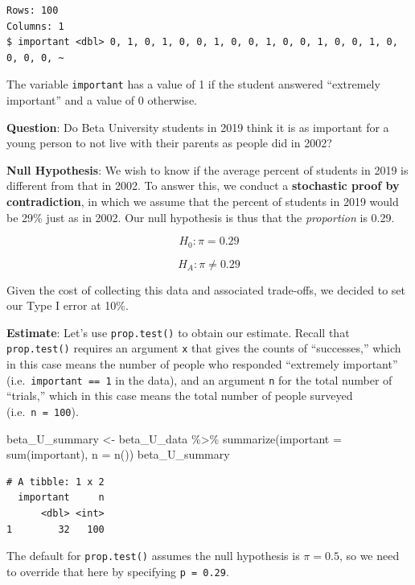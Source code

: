 \documentclass[
  letterpaper,
  DIV=11,
  numbers=noendperiod]{scrreprt}
\newenvironment{Shaded}{\begin{snugshade}}{\end{snugshade}}
\newcommand{\AttributeTok}[1]{\textcolor[rgb]{0.40,0.45,0.13}{#1}}
\newcommand{\FunctionTok}[1]{\textcolor[rgb]{0.28,0.35,0.67}{#1}}
\newcommand{\NormalTok}[1]{\textcolor[rgb]{0.00,0.23,0.31}{#1}}
\newcommand{\OtherTok}[1]{\textcolor[rgb]{0.00,0.23,0.31}{#1}}
\newcommand{\SpecialCharTok}[1]{\textcolor[rgb]{0.37,0.37,0.37}{#1}}
\theoremstyle{definition}
\theoremstyle{remark}
\begin{document}
\begin{verbatim}
Rows: 100
Columns: 1
$ important <dbl> 0, 1, 0, 1, 0, 0, 1, 0, 0, 1, 0, 0, 1, 0, 0, 1, 0, 0, 0, 0, ~
\end{verbatim}

The variable \texttt{important} has a value of 1 if the student answered
``extremely important'' and a value of 0 otherwise.

\textbf{Question}: Do Beta University students in 2019 think it is as
important for a young person to not live with their parents as people
did in 2002?

\textbf{Null Hypothesis}: We wish to know if the average percent of
students in 2019 is different from that in 2002. To answer this, we
conduct a \textbf{stochastic proof by contradiction}, in which we assume
that the percent of students in 2019 would be 29\% just as in 2002. Our
null hypothesis is thus that the \emph{proportion} is 0.29.

\[H_0: \pi = 0.29\]

\[H_A: \pi \neq 0.29\]

Given the cost of collecting this data and associated trade-offs, we
decided to set our Type I error at 10\%.

\textbf{Estimate}: Let's use \texttt{prop.test()} to obtain our
estimate. Recall that \texttt{prop.test()} requires an argument
\texttt{x} that gives the counts of ``successes,'' which in this case
means the number of people who responded ``extremely important''
(i.e.~\texttt{important\ ==\ 1} in the data), and an argument \texttt{n}
for the total number of ``trials,'' which in this case means the total
number of people surveyed (i.e.~\texttt{n\ =\ 100}).

\begin{Shaded}
\begin{Highlighting}[]
\NormalTok{beta\_U\_summary }\OtherTok{\textless{}{-}}\NormalTok{ beta\_U\_data }\SpecialCharTok{\%\textgreater{}\%} 
  \FunctionTok{summarize}\NormalTok{(}\AttributeTok{important =} \FunctionTok{sum}\NormalTok{(important),}
            \AttributeTok{n =} \FunctionTok{n}\NormalTok{())}
\NormalTok{beta\_U\_summary}
\end{Highlighting}
\end{Shaded}

\begin{verbatim}
# A tibble: 1 x 2
  important     n
      <dbl> <int>
1        32   100
\end{verbatim}

The default for \texttt{prop.test()} assumes the null hypothesis is
\(\pi = 0.5\), so we need to override that here by specifying
\texttt{p\ =\ 0.29}.
\end{document}
